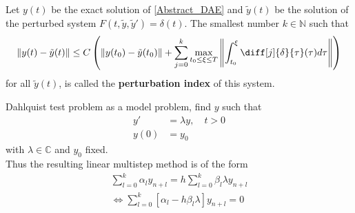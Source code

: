 \begin{frame}[noframenumbering]
	\vfill
	\begin{definition}%
		Let $y(t)$ be the exact solution of \eqref{Abstract_DAE} and $\tilde{y}(t)$ be the solution of the perturbed system $F(t, \tilde{y}, \tilde{y}') = \delta(t)$. The smallest number $k \in \mathbb{N}$ such that 
		\begin{displaymath}
			\|y(t)-\tilde{y}(t)\| \leq C \left(\|y(t_0)-\tilde{y}(t_0)\|+\sum_{j=0}^{k}\max_{t_0 \leq \xi \leq T} \left\rVert 		\int_{t_0}^{\xi}\diff[j]{\delta}{\tau}(\tau)d \tau \right\rVert \right)
		\end{displaymath}
		for all $\tilde{y}(t)$, is called the \textbf{perturbation index} of this system.
	\end{definition}
	\vfill
\end{frame}

\begin{frame}[noframenumbering]
	Dahlquist test problem as a model problem, find $y$ such that
	\begin{align}
		y' &= \lambda y, \quad t > 0 \\
		y(0) &= y_0
	\end{align}
	with $\lambda \in \mathbb{C}$ and $y_0$ fixed. \\
	Thus the resulting linear multistep method is of the form
	\begin{align*}
		\sum_{l=0}^{k} \alpha_l y_{n+l} = h \sum_{l=0}^{k} \beta_l \lambda y_{n+l} \\
		\iff \sum_{l=0}^{k}  [\alpha_l - h \beta_l \lambda] y_{n+l} = 0
	\end{align*}
\end{frame}

